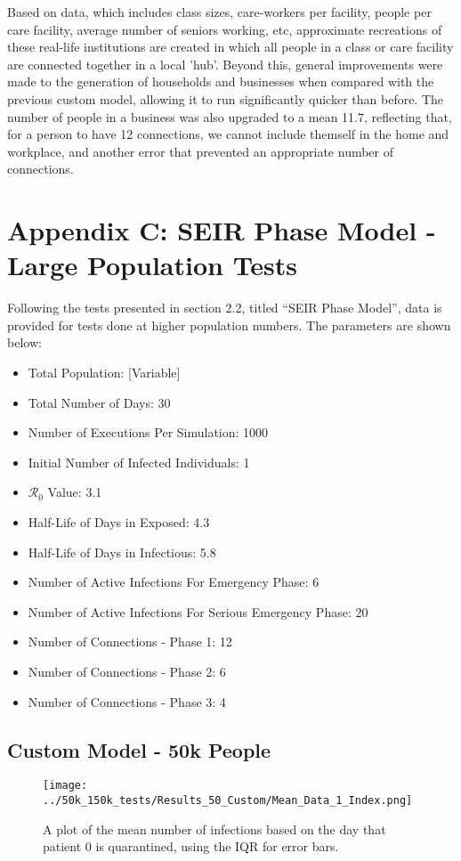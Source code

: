 \documentclass{article}
\numberwithin{equation}{section} %
\begin{document}
\begin{multicols}{2}
  Based on data, which includes class sizes, care-workers per facility, people per care facility, average number of seniors working, etc, approximate recreations of these real-life institutions are created in which all people in a class or care facility are connected together in a local 'hub'. Beyond this, general improvements were made to the generation of households and businesses when compared with the previous custom model, allowing it to run significantly quicker than before. The number of people in a business was also upgraded to a mean 11.7, reflecting that, for a person to have 12 connections, we cannot include themself in the home and workplace, and another error that prevented an appropriate number of connections.

\end{multicols}

\newpage

\section{Appendix C: SEIR Phase Model - Large Population Tests}
Following the tests presented in section 2.2, titled ``SEIR Phase Model'', data is provided for tests done at higher population numbers. The parameters are shown below:
\begin{itemize}
\item Total Population: [Variable]
\item Total Number of Days: 30
\item Number of Executions Per Simulation: 1000
\item Initial Number of Infected Individuals: 1
\item $\mathcal{R}_0$ Value: 3.1
\item Half-Life of Days in Exposed: 4.3
\item Half-Life of Days in Infectious: 5.8
\item Number of Active Infections For Emergency Phase: 6
\item Number of Active Infections For Serious Emergency Phase: 20
\item Number of Connections - Phase 1: 12
\item Number of Connections - Phase 2: 6
\item Number of Connections - Phase 3: 4
\end{itemize}
\subsection{Custom Model - 50k People}
\begin{figure}[H]
  \centering
  \texttt{[image: ../50k\_150k\_tests/Results\_50\_Custom/Mean\_Data\_1\_Index.png]}
  \caption{A plot of the mean number of infections based on the day that patient 0 is quarantined, using the IQR for error bars.}
\end{figure}
\end{document}
